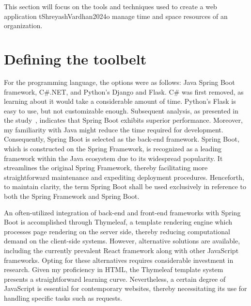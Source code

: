 This section will focus on the tools and techniques used to create a web application tShreyashVardhan2024o manage time and space resources of an organization.


\section{Defining the toolbelt}\label{sec:defining-the-toolbelt}

For the programming language, the options were as follows: Java Spring Boot framework, C\#.NET, and Python's Django and Flask.
C\# was first removed, as learning about it would take a considerable amount of time.
Python's Flask is easy to use, but not customizable enough.
Subsequent analysis, as presented in the study~\cite{ShreyashVardhan2024}, indicates that Spring Boot exhibits superior performance.
Moreover, my familiarity with Java might reduce the time required for development.
Consequently, Spring Boot is selected as the back-end framework.
Spring Boot, which is constructed on the Spring Framework, is recognized as a leading framework within the Java ecosystem due to its widespread popularity.
It streamlines the original Spring Framework, thereby facilitating more straightforward maintenance and expediting deployment procedures.
Henceforth, to maintain clarity, the term Spring Boot shall be used exclusively in reference to both the Spring Framework and Spring Boot.

An often-utilized integration of back-end and front-end frameworks with Spring Boot is accomplished through Thymeleaf, a template rendering engine which processes page rendering on the server side, thereby reducing computational demand on the client-side systems.
However, alternative solutions are available, including the currently prevalent React framework along with other JavaScript frameworks.
Opting for these alternatives requires considerable investment in research.
Given my proficiency in HTML, the Thymeleaf template system presents a straightforward learning curve.
Nevertheless, a certain degree of JavaScript is essential for contemporary websites, thereby necessitating its use for handling specific tasks such as requests.


